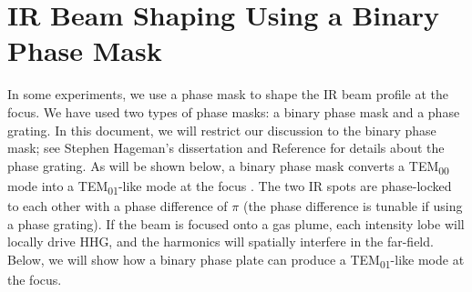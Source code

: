 \section{IR Beam Shaping Using a Binary Phase Mask}
\label{sec:pi-plate-math}


In some experiments, we use a phase mask to shape the IR beam profile at the focus. We have used two types of phase masks: a binary phase mask and a phase grating. In this document, we will restrict our discussion to the binary phase mask; see Stephen Hageman's dissertation \cite{hagemanComplexAttosecondTransient2020} and Reference \cite{camperHighRelativephasePrecision2019} for details about the phase grating. As will be shown below, a binary phase mask converts a TEM\textsubscript{00} mode into a TEM\textsubscript{01}-like mode at the focus \cite{hagemanComplexAttosecondTransient2020,camperHighRelativephasePrecision2019,camperTransverseElectromagneticMode2015,camperHighharmonicPhaseSpectroscopy2014,camperCombinedHighharmonicInterferometries2015}. The two IR spots are phase-locked to each other with a phase difference of $\pi$ (the phase difference is tunable if using a phase grating). If the beam is focused onto a gas plume, each intensity lobe will locally drive HHG, and the harmonics will spatially interfere in the far-field. Below, we will show how a binary phase plate can produce a TEM\textsubscript{01}-like mode at the focus.

